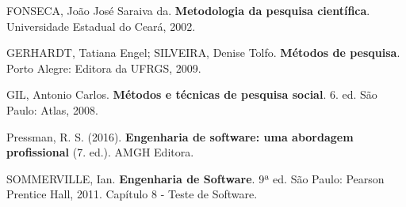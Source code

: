 \makeatletter
{}
\makeatother
\printbibliography

\begin{flushleft}
\setlength{\parskip}{1em}
\renewcommand{\baselinestretch}{1.0}\selectfont
\setlength{\parskip}{\baselineskip}


FONSECA, João José Saraiva da. \textbf{Metodologia da pesquisa científica}. Universidade Estadual do Ceará, 2002.

GERHARDT, Tatiana Engel; SILVEIRA, Denise Tolfo. \textbf{Métodos de pesquisa}. Porto Alegre: Editora da UFRGS, 2009.

GIL, Antonio Carlos. \textbf{Métodos e técnicas de pesquisa social}. 6. ed. São Paulo: Atlas, 2008.

Pressman, R. S. (2016). \textbf{Engenharia de software: uma abordagem profissional} (7. ed.). AMGH Editora.

SOMMERVILLE, Ian. \textbf{Engenharia de Software}. 9ª ed. São Paulo: Pearson Prentice Hall, 2011. Capítulo 8 - Teste de Software.

\end{flushleft}